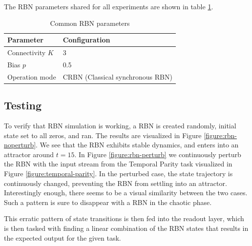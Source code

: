 The RBN parameters shared for all experiments are shown in table
\ref{table:shared-rbn-parameters}.

\begin{table}[h]
    \centering
    \caption{Common RBN parameters}
    \label{table:shared-rbn-parameters}
    \begin{tabular}{ll}
        \hline
        \textbf{Parameter} & \textbf{Configuration} \\
        \hline
        \hline
        Connectivity $K$ & 3   \\
        Bias $p$         & 0.5 \\
        Operation mode & CRBN (Classical synchronous RBN) \\
        \hline
    \end{tabular}
\end{table}

\subsection{Testing}

To verify that RBN simulation is working,
a RBN is created randomly, initial state set to all zeros, and ran.
The results are visualized in Figure \ref{figure:rbn-noperturb}.
We see that the RBN exhibits stable dynamics, and enters into an attractor around $t=15$.
In Figure \ref{figure:rbn-perturb} we continuously perturb the RBN with the input stream from the Temporal Parity task visualized in Figure \ref{figure:temporal-parity}.
In the perturbed case, the state trajectory is continuously changed, preventing the RBN from settling into an attractor.
Interestingly enough, there seems to be a visual similarity between the two cases.
Such a pattern is sure to disappear with a RBN in the chaotic phase.

This erratic pattern of state transitions is then fed into the readout layer,
which is then tasked with finding a linear combination of the RBN states that results in the expected output for the given task.

